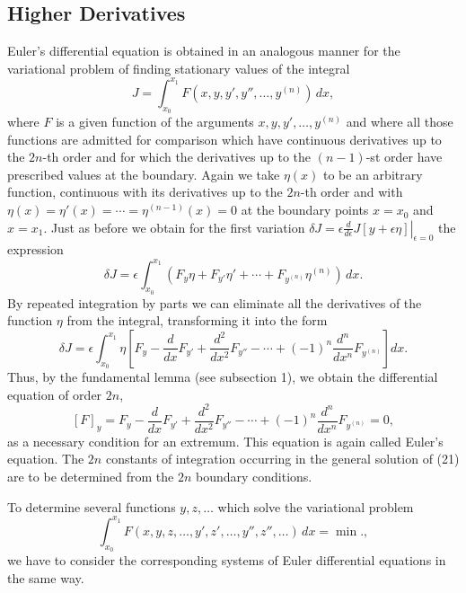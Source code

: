 \subsection{Higher Derivatives}
Euler's differential equation is obtained in an analogous manner for the variational problem of finding stationary values of the integral
\begin{equation}\tag{19}
J=\int_{x_0}^{x_1}F(x,y,y',y'',\ldots,y^{(n)})\,dx,
\end{equation}
where $F$ is a given function of the arguments $x,y,y',\ldots,y^{(n)}$ and where all those functions are admitted for comparison which have continuous derivatives up to the $2n$-th order and for which the derivatives up to the $(n-1)$-st order have prescribed values at the boundary. Again we take $\eta(x)$ to be an arbitrary function, continuous with its derivatives up to the $2n$-th order and with $\eta(x)=\eta'(x)=\cdots=\eta^{(n-1)}(x)=0$ at the boundary points $x=x_0$ and $x=x_1$. Just as before we obtain for the first variation $\delta J=\left.\epsilon\frac{d}{d\epsilon}J[y+\epsilon\eta]\right|_{\epsilon=0}$ the expression
\[
\delta J=\epsilon\int_{x_0}^{x_1}(F_y\eta+F_{y'}\eta'+\cdots+F_{y^{(n)}}\eta^{(n)})\,dx.
\]
By repeated integration by parts we can eliminate all the derivatives of the function $\eta$ from the integral, transforming it into the form
\begin{equation}\tag{20}
\delta J=\epsilon\int_{x_0}^{x_1}\eta\left[F_y-\frac{d}{dx}F_{y'}+\frac{d^2}{dx^2}F_{y''}-\cdots+(-1)^n\frac{d^n}{dx^n}F_{y^{(n)}}\right]dx.
\end{equation}
Thus, by the fundamental lemma (see subsection 1), we obtain the differential equation of order $2n$,
\begin{equation}\tag{21}
[F]_y=F_y-\frac{d}{dx}F_{y'}+\frac{d^2}{dx^2}F_{y''}-\cdots+(-1)^n\frac{d^n}{dx^n}F_{y^{(n)}}=0,
\end{equation}
as a necessary condition for an extremum. This equation is again called Euler's equation. The $2n$ constants of integration occurring in the general solution of (21) are to be determined from the $2n$ boundary conditions.

To determine several functions $y,z,\ldots$ which solve the variational problem
\[
\int_{x_0}^{x_1}F(x,y,z,\ldots,y',z',\ldots,y'',z'',\ldots)\,dx=\min.,
\]
we have to consider the corresponding systems of Euler differential equations in the same way.

